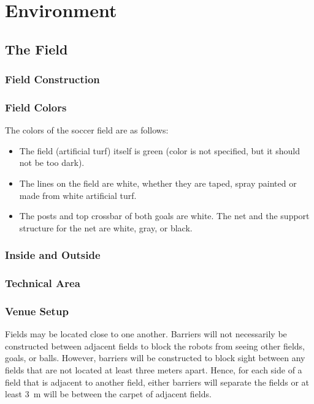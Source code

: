 \section{Environment}
\label{sec:environment}

\subsection{The Field}
\label{sec:field}

\subsubsection{Field Construction}

\subsubsection{Field Colors}
\label{sec:field_colors}

The colors of the soccer field are as follows:
\begin{itemize}
  \item The field (artificial turf) itself is green (color is not specified, but it should not be too dark).
  \item The lines on the field are white, whether they are taped, spray painted or made from white artificial turf.
  \item The posts and top crossbar of both goals are white.
    The net and the support structure for the net are white, gray, or black.
\end{itemize}

\subsubsection{Inside and Outside}
\subsubsection{Technical Area}

\subsubsection{Venue Setup}
\label{sec:boundaries}

Fields may be located close to one another.
Barriers will not necessarily be constructed between adjacent fields to block the robots from seeing other fields, goals, or balls.
However, barriers will be constructed to block sight between any fields that are not located at least three meters apart.
Hence, for each side of a field that is adjacent to another field, either barriers will separate the fields or at least \qty{3}{\metre} will be between the carpet of adjacent fields.

